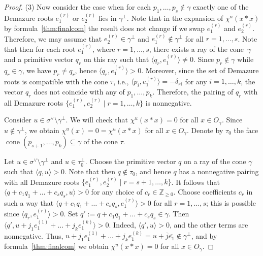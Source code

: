 \documentclass[10pt,a4paper]{amsart}
\DeclareMathOperator{\cone}{cone}
\newcommand{\ZZ}{\mathbb{Z}}
\newcommand{\ol}[1]{\overline{#1}}
\begin{document}
\begin{proof}
\bigskip

(3) Now consider the case when for each $p_1, \ldots, p_s \notin \gamma$ exactly one of the Demazure roots $e_1^{(r)}$ or $e_2^{(r)}$ lies in $\gamma^\perp$. Note that in the expansion of $\chi^u(x*x)$ by formula~\eqref{thm:finalcom} the result does not change if we swap $e_1^{(r)}$ and $e_2^{(r)}$. Therefore, we may assume that $e_2^{(r)} \in \gamma^\perp$ and $e_1^{(r)} \notin \gamma^\perp$ for all $r = 1, \ldots, s$. Note that then for each root $e_1^{(r)}$, where $r = 1, \ldots, s$, there exists a ray of the cone~$\gamma$ and a primitive vector $q_r$ on this ray such that $\langle q_r, e_1^{(r)} \rangle \neq 0$. Since $p_r \notin \gamma$ while $q_r \in \gamma$, we have $p_r \neq q_r$, hence $\langle q_r, e_1^{(r)} \rangle > 0$. Moreover, since the set of Demazure roots is compatible with the cone $\tau$, i.e., $\langle p_i, e_1^{(r)} \rangle = -\delta_{ri}$ for any $i = 1, \ldots, k$, the vector $q_r$ does not coincide with any of $p_1, \ldots, p_k$. Therefore, the pairing of $q_r$ with all Demazure roots $\{e_1^{(r)}, e_2^{(r)} \mid r = 1,\ldots,k\}$ is nonnegative.

Consider $u \in \sigma^\vee \setminus \gamma^\perp$. We will check that $\chi^u(x*x) = 0$ for all $x \in O_\gamma$. Since $u \notin \gamma^\perp$, we obtain $\chi^u(x) = 0 = \chi^u(x*x)$ for all $x \in O_\gamma$. Denote by $\tau_0$ the face $\cone(p_{s+1}, \ldots, p_k) \subseteq \gamma$ of the cone $\tau$.

Let $u \in \sigma^\vee \setminus \gamma^\perp$ and $u \in \tau_0^\perp$. Choose the primitive vector $q$ on a ray of the cone $\gamma$ such that $\langle q, u \rangle > 0$. Note that then $q \notin \tau_0$, and hence $q$ has a nonnegative pairing with all Demazure roots $\{e_1^{(r)}, e_2^{(r)} \mid r = s+1,\ldots,k\}$. It follows that $\langle q + c_1 q_1 + \ldots + c_s q_s, u \rangle > 0$ for any choice of $c_r \in \ZZ_{\geq 0}$. Choose coefficients $c_r$ in such a way that $\langle q + c_1 q_1 + \ldots + c_s q_s, e_1^{(r)} \rangle > 0$ for all $r = 1, \ldots, s$; this is possible since $\langle q_r, e_1^{(r)} \rangle > 0$. Set $q' := q + c_1 q_1 + \ldots + c_s q_s \in \gamma$. Then $\langle q', u + j_1 e_1^{(1)} + \ldots + j_k e_1^{(k)} \rangle > 0$. Indeed, $\langle q', u \rangle > 0$, and the other terms are nonnegative. Thus, $u + j_1 e_1^{(1)} + \ldots + j_k e_1^{(k)} = u + \ol{j} \ol{e_1} \notin \gamma^\perp$, and by formula~\eqref{thm:finalcom} we obtain $\chi^u(x*x) = 0$ for all $x \in O_\gamma$.


\end{proof}
\end{document}
